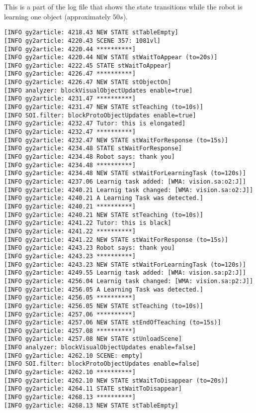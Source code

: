 \documentclass{article}
\begin{document}
This is a part of the log file that shows the state transitions while the robot
is learning one object (approximately $50s$).

\begin{verbatim}
[INFO gy2article: 4218.43 NEW STATE stTableEmpty]
[INFO gy2article: 4220.43 SCENE 357: 1081vl]
[INFO gy2article: 4220.44 **********]
[INFO gy2article: 4220.44 NEW STATE stWaitToAppear (to=20s)]
[INFO gy2article: 4222.45 STATE stWaitToAppear]
[INFO gy2article: 4226.47 **********]
[INFO gy2article: 4226.47 NEW STATE stObjectOn]
[INFO analyzer: blockVisualObjectUpdates enable=true]
[INFO gy2article: 4231.47 **********]
[INFO gy2article: 4231.47 NEW STATE stTeaching (to=10s)]
[INFO SOI.filter: blockProtoObjectUpdates enable=true]
[INFO gy2article: 4232.47 Tutor: this is elongated]
[INFO gy2article: 4232.47 **********]
[INFO gy2article: 4232.47 NEW STATE stWaitForResponse (to=15s)]
[INFO gy2article: 4234.48 STATE stWaitForResponse]
[INFO gy2article: 4234.48 Robot says: thank you]
[INFO gy2article: 4234.48 **********]
[INFO gy2article: 4234.48 NEW STATE stWaitForLearningTask (to=120s)]
[INFO gy2article: 4237.06 Learnig task added: [WMA: vision.sa:o2:J]]
[INFO gy2article: 4240.21 Learnig task changed: [WMA: vision.sa:o2:J]]
[INFO gy2article: 4240.21 A Learning Task was detected.]
[INFO gy2article: 4240.21 **********]
[INFO gy2article: 4240.21 NEW STATE stTeaching (to=10s)]
[INFO gy2article: 4241.22 Tutor: this is black]
[INFO gy2article: 4241.22 **********]
[INFO gy2article: 4241.22 NEW STATE stWaitForResponse (to=15s)]
[INFO gy2article: 4243.23 Robot says: thank you]
[INFO gy2article: 4243.23 **********]
[INFO gy2article: 4243.23 NEW STATE stWaitForLearningTask (to=120s)]
[INFO gy2article: 4249.55 Learnig task added: [WMA: vision.sa:p2:J]]
[INFO gy2article: 4256.04 Learnig task changed: [WMA: vision.sa:p2:J]]
[INFO gy2article: 4256.05 A Learning Task was detected.]
[INFO gy2article: 4256.05 **********]
[INFO gy2article: 4256.05 NEW STATE stTeaching (to=10s)]
[INFO gy2article: 4257.06 **********]
[INFO gy2article: 4257.06 NEW STATE stEndOfTeaching (to=15s)]
[INFO gy2article: 4257.08 **********]
[INFO gy2article: 4257.08 NEW STATE stUnloadScene]
[INFO analyzer: blockVisualObjectUpdates enable=false]
[INFO gy2article: 4262.10 SCENE: empty]
[INFO SOI.filter: blockProtoObjectUpdates enable=false]
[INFO gy2article: 4262.10 **********]
[INFO gy2article: 4262.10 NEW STATE stWaitToDisappear (to=20s)]
[INFO gy2article: 4264.11 STATE stWaitToDisappear]
[INFO gy2article: 4268.13 **********]
[INFO gy2article: 4268.13 NEW STATE stTableEmpty]
\end{verbatim}
\end{document}
